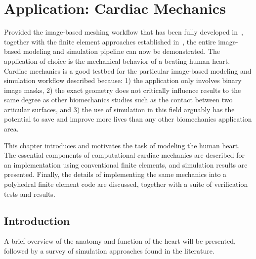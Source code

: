 \chapter{Application: Cardiac Mechanics}
\label{chap:5}
%
Provided the image-based meshing workflow that has been fully developed in~, together with the finite element approaches established in~, the entire image-based modeling and simulation pipeline can now be demonstrated. The application of choice is the mechanical behavior of a beating human heart. Cardiac mechanics is a good testbed for the particular image-based modeling and simulation workflow described because: 1) the application only involves binary image masks, 2) the exact geometry does not critically influence results to the same degree as other biomechanics studies such as the contact between two articular surfaces, and 3) the use of simulation in this field arguably has the potential to save and improve more lives than any other biomechanics application area.

This chapter introduces and motivates the task of modeling the human heart. The essential components of computational cardiac mechanics are described for an implementation using conventional finite elements, and simulation results are presented. Finally, the details of implementing the same mechanics into a polyhedral finite element code are discussed, together with a suite of verification tests and results.

\section{Introduction}

A brief overview of the anatomy and function of the heart will be presented, followed by a survey of simulation approaches found in the literature.

